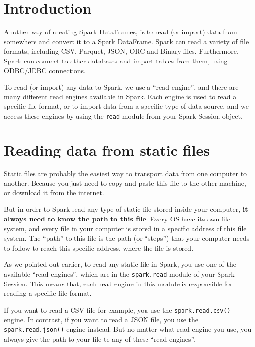 \documentclass[
  11pt,
  letterpaper,
  DIV=11,
  numbers=noendperiod]{scrreprt}
\begin{document}
\hypertarget{introduction-5}{%
\section{Introduction}\label{introduction-5}}

Another way of creating Spark DataFrames, is to read (or import) data
from somewhere and convert it to a Spark DataFrame. Spark can read a
variety of file formats, including CSV, Parquet, JSON, ORC and Binary
files. Furthermore, Spark can connect to other databases and import
tables from them, using ODBC/JDBC connections.

To read (or import) any data to Spark, we use a ``read engine'', and
there are many different read engines available in Spark. Each engine is
used to read a specific file format, or to import data from a specific
type of data source, and we access these engines by using the
\texttt{read} module from your Spark Session object.

\hypertarget{reading-data-from-static-files}{%
\section{Reading data from static
files}\label{reading-data-from-static-files}}

Static files are probably the easiest way to transport data from one
computer to another. Because you just need to copy and paste this file
to the other machine, or download it from the internet.

But in order to Spark read any type of static file stored inside your
computer, \textbf{it always need to know the path to this file}. Every
OS have its own file system, and every file in your computer is stored
in a specific address of this file system. The ``path'' to this file is
the path (or ``steps'') that your computer needs to follow to reach this
specific address, where the file is stored.

As we pointed out earlier, to read any static file in Spark, you use one
of the available ``read engines'', which are in the \texttt{spark.read}
module of your Spark Session. This means that, each read engine in this
module is responsible for reading a specific file format.

If you want to read a CSV file for example, you use the
\texttt{spark.read.csv()} engine. In contrast, if you want to read a
JSON file, you use the \texttt{spark.read.json()} engine instead. But no
matter what read engine you use, you always give the path to your file
to any of these ``read engines''.
\end{document}
